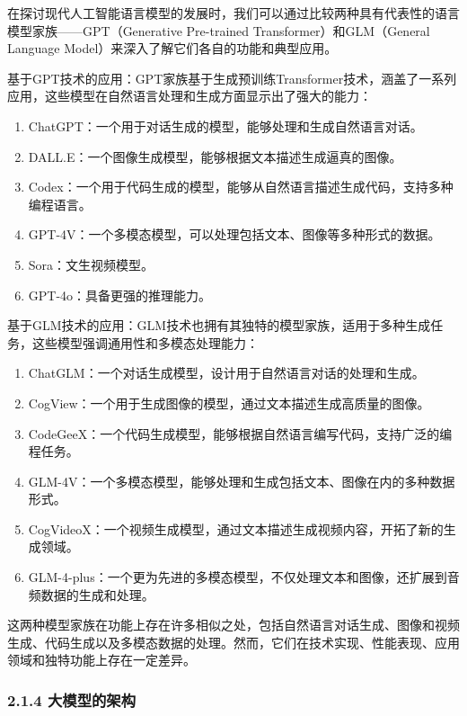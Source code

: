 在探讨现代人工智能语言模型的发展时，我们可以通过比较两种具有代表性的语言模型家族------GPT（Generative
Pre-trained Transformer）和GLM（General Language
Model）来深入了解它们各自的功能和典型应用。

基于GPT技术的应用：GPT家族基于生成预训练Transformer技术，涵盖了一系列应用，这些模型在自然语言处理和生成方面显示出了强大的能力：

\begin{enumerate}
\def\labelenumi{\arabic{enumi}.}
\item
  ChatGPT：一个用于对话生成的模型，能够处理和生成自然语言对话。
\item
  DALL.E：一个图像生成模型，能够根据文本描述生成逼真的图像。
\item
  Codex：一个用于代码生成的模型，能够从自然语言描述生成代码，支持多种编程语言。
\item
  GPT-4V：一个多模态模型，可以处理包括文本、图像等多种形式的数据。
\item
  Sora：文生视频模型。
\item
  GPT-4o：具备更强的推理能力。
\end{enumerate}

基于GLM技术的应用：GLM技术也拥有其独特的模型家族，适用于多种生成任务，这些模型强调通用性和多模态处理能力：

\begin{enumerate}
\def\labelenumi{\arabic{enumi}.}
\item
  ChatGLM：一个对话生成模型，设计用于自然语言对话的处理和生成。
\item
  CogView：一个用于生成图像的模型，通过文本描述生成高质量的图像。
\item
  CodeGeeX：一个代码生成模型，能够根据自然语言编写代码，支持广泛的编程任务。
\item
  GLM-4V：一个多模态模型，能够处理和生成包括文本、图像在内的多种数据形式。
\item
  CogVideoX：一个视频生成模型，通过文本描述生成视频内容，开拓了新的生成领域。
\item
  GLM-4-plus：一个更为先进的多模态模型，不仅处理文本和图像，还扩展到音频数据的生成和处理。
\end{enumerate}

这两种模型家族在功能上存在许多相似之处，包括自然语言对话生成、图像和视频生成、代码生成以及多模态数据的处理。然而，它们在技术实现、性能表现、应用领域和独特功能上存在一定差异。

\subsubsection{\texorpdfstring{\textbf{2.1.4
大模型的架构}}{2.1.4 大模型的架构}}\label{214-ux5927ux6a21ux578bux7684ux67b6ux6784}

